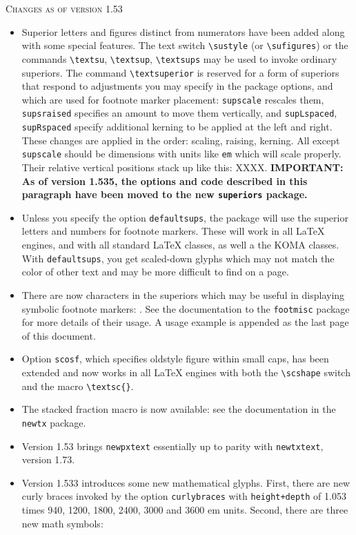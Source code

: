 \documentclass[11pt]{article}
\theoremstyle{oldplain}
\theoremstyle{plain}
\begin{document}
\textsc{Changes as of version 1.53}
\begin{itemize}
\item
Superior letters and figures distinct from numerators have been added along with some special features. The text switch \verb|\sustyle| (or \verb|\sufigures|) or the commands \verb|\textsu|, \verb|\textsup|, \verb|\textsups| may be used to invoke ordinary superiors. The command \verb|\textsuperior| is reserved for a form of superiors that respond to adjustments you may specify in the package options, and which are used for footnote marker placement: \verb|supscale| rescales them, \verb|supsraised| specifies an amount to move them vertically, and \verb|supLspaced|, \verb|supRspaced| specify additional kerning to be applied at the left and right. These changes are applied in the order: scaling, raising, kerning. All except \verb|supscale| should be dimensions with units like {\tt em} which will scale properly. Their relative vertical positions stack up like this: XXXX. \textbf{IMPORTANT: As of version 1.535, the options and code described in this paragraph have been moved to the new {\tt superiors} package.}
\item
Unless you specify the option {\tt defaultsups}, the package will use the superior letters and numbers for footnote markers. These will work in all LaTeX engines, and with all standard LaTeX classes, as well a the KOMA classes. With {\tt defaultsups}, you get scaled-down glyphs which may not match the color of other text and may be more difficult to find on a page.
\item
There are now characters in the superiors which may be useful in displaying symbolic footnote markers: \textsu{\textsection, \textparagraph, \textdagger, \textdaggerdbl, \textbardbl, \textasteriskcentered}. See the documentation to the {\tt footmisc} package for more details of their usage. A usage example is appended as the last page of this document.
\item Option {\tt scosf}, which specifies oldstyle figure within small caps, has been extended and now works in all LaTeX engines with both the \verb|\scshape| switch and the macro \verb|\textsc{}|.
\item
The stacked fraction macro is now available: see the documentation in the {\tt newtx} package.
\item
Version 1.53 brings {\tt newpxtext} essentially up to parity with {\tt newtxtext}, version 1.73.
\item 
Version 1.533 introduces some new mathematical glyphs. First,  there are new curly braces invoked by the option {\tt curlybraces} with {\tt height+depth} of 1.053 times 940, 1200, 1800, 2400, 3000 and 3600 em units. Second, there are three new math symbols:

\end{itemize}
\end{document}
